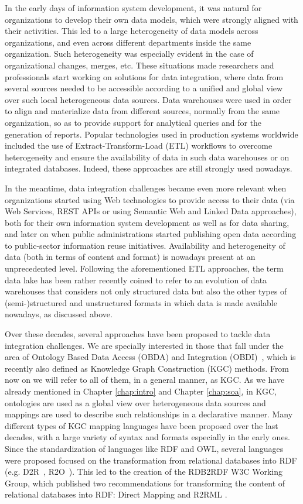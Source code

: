 In the early days of information system development, it was natural for organizations to develop their own data models, which were strongly aligned with their activities. This led to a large heterogeneity of data models across organizations, and even across different departments inside the same organization. Such heterogeneity was especially evident in the case of organizational changes, merges, etc. These situations made researchers and professionals start working on solutions for data integration, where data from several sources needed to be accessible according to a unified and global view over such local heterogeneous data sources. Data warehouses were used in order to align and materialize data from different sources, normally from the same organization, so as to provide support for analytical queries and for the generation of reports. Popular technologies used in production systems worldwide included the use of Extract-Transform-Load (ETL) workflows to overcome heterogeneity and ensure the availability of data in such data warehouses or on integrated databases. Indeed, these approaches are still strongly used nowadays.

In the meantime, data integration challenges became even more relevant when organizations started using Web technologies to provide access to their data (via Web Services, REST APIs or using Semantic Web and Linked Data approaches), both for their own information system development as well as for data sharing, and later on when public administrations started publishing open data according to  public-sector information reuse initiatives. Availability and heterogeneity of data (both in terms of content and format) is nowadays present at an unprecedented level. Following the aforementioned ETL approaches, the term data lake has been rather recently coined to refer to an evolution of data warehouses that considers not only structured data but also the other types of (semi-)structured and unstructured formats in which data is made available nowadays, as discussed above.

Over these decades, several approaches have been proposed to tackle data integration challenges. We are specially interested in those that fall under the area of Ontology Based Data Access (OBDA) and Integration (OBDI)~\citep{poggi2008linking}, which is recently also defined as Knowledge Graph Construction (KGC) methods. From now on we will refer to all of them, in a general manner, as KGC. As we have already mentioned in Chapter \ref{chap:intro} and Chapter \ref{chap:soa}, in KGC, ontologies are used as a global view over heterogeneous data sources and mappings are used to describe such relationships in a declarative manner. Many different types of KGC mapping languages have been proposed over the last decades, with a large variety of syntax and formats especially in the early ones. Since the standardization of languages like RDF and OWL, several languages were proposed focused on the transformation from relational databases into RDF (e.g. D2R~\citep{bizer2004d2rq}, R2O~\citep{barrasa2004r2o}). This led to the creation of the RDB2RDF W3C Working Group, which published two recommendations for transforming the content of relational databases into RDF: Direct Mapping \citep{arenas2013direct} and R2RML \citep{R2RML}.

